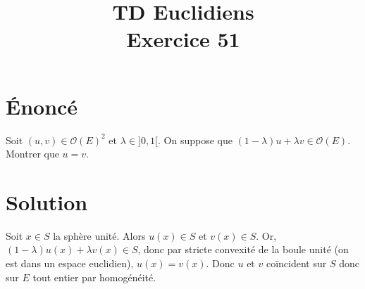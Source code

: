 \documentclass[french]{article}
\title{TD Euclidiens\\ Exercice 51}
\date{}
\begin{document}
\maketitle

\section{Énoncé}
Soit $(u,v)\in\mathcal{O}(E)^2$ et $\lambda\in]0,1[$. On suppose que $(1-\lambda)u+\lambda v\in\mathcal{O}(E)$. Montrer que $u=v$.
\section{Solution}
Soit $x\in S$ la sphère unité. Alors $u(x)\in S$ et $v(x)\in S$. Or, $(1-\lambda)u(x)+\lambda v(x)\in S$, donc par stricte convexité de la boule unité (on est dans un espace euclidien), $u(x)=v(x)$. Donc $u$ et $v$ coïncident sur $S$ donc sur $E$ tout entier par homogénéité.
\end{document}
